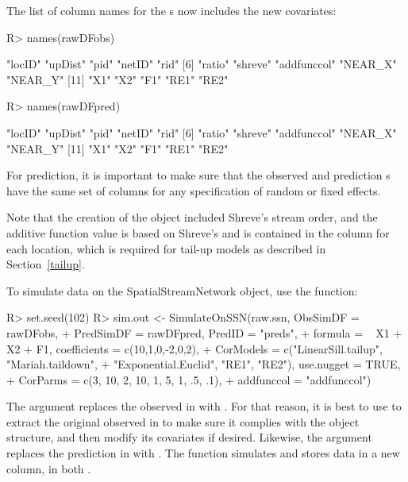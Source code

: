 \documentclass[nojss]{jss}
\renewenvironment{Schunk}{\vspace{\topsep}}{\vspace{\topsep}}
\begin{document}
The list of column names for the s now includes the
new covariates:
\begin{Schunk}
\begin{Sinput}
R> names(rawDFobs)
\end{Sinput}
\begin{Soutput}
 [1] "locID"      "upDist"     "pid"        "netID"      "rid"       
 [6] "ratio"      "shreve"     "addfunccol" "NEAR_X"     "NEAR_Y"    
[11] "X1"         "X2"         "F1"         "RE1"        "RE2"       
\end{Soutput}
\begin{Sinput}
R> names(rawDFpred)
\end{Sinput}
\begin{Soutput}
 [1] "locID"      "upDist"     "pid"        "netID"      "rid"       
 [6] "ratio"      "shreve"     "addfunccol" "NEAR_X"     "NEAR_Y"    
[11] "X1"         "X2"         "F1"         "RE1"        "RE2"       
\end{Soutput}
\end{Schunk}

For prediction, it is important to make sure that the observed and
prediction s have the same set of columns for any
specification of random or fixed effects.

Note that the creation of the  object
included Shreve's stream order, and the additive function value is
based on Shreve's and is contained in the  column for
each location, which is required for tail-up models as described in
Section~\ref{tailup}.

To simulate data on the SpatialStreamNetwork object, use the
 function:

\begin{Schunk}
\begin{Sinput}
R> set.seed(102)
R> sim.out <- SimulateOnSSN(raw.ssn, ObsSimDF = rawDFobs,
+     PredSimDF = rawDFpred, PredID = "preds",
+     formula = ~ X1 + X2 + F1, coefficients = c(10,1,0,-2,0,2),
+     CorModels = c("LinearSill.tailup", "Mariah.taildown",
+     "Exponential.Euclid", "RE1", "RE2"), use.nugget = TRUE,
+     CorParms = c(3, 10, 2, 10, 1, 5, 1, .5, .1),
+     addfunccol = "addfunccol")
\end{Sinput}
\end{Schunk}

The  argument replaces the observed 
 in  with .  For that
reason, it is best to use  to extract the
original observed   in
 to make sure it complies with the object structure, and
then modify its covariates if desired. Likewise, the 
argument replaces the prediction  
in  with . The function
 simulates and stores data in a new column,
 in both 
.
\end{document}
